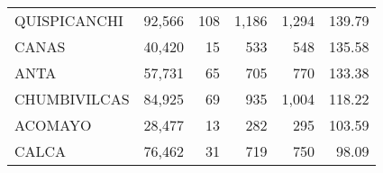 \begin{tabular}{lrrrrr}
	\cellcolor[HTML]{FFFFC7}QUISPICANCHI                                               & 92,566                                                         & 108                                                      & 1,186                                                    & 1,294                                                               & 139.79                                                                       \\
	\cellcolor[HTML]{FFFFC7}CANAS                                                      & 40,420                                                         & 15                                                       & 533                                                      & 548                                                                 & 135.58                                                                       \\
	\cellcolor[HTML]{FFFFC7}ANTA                                                       & 57,731                                                         & 65                                                       & 705                                                      & 770                                                                 & 133.38                                                                       \\
	\cellcolor[HTML]{9AFF99}CHUMBIVILCAS                                               & 84,925                                                         & 69                                                       & 935                                                      & 1,004                                                               & 118.22                                                                       \\
	\cellcolor[HTML]{9AFF99}ACOMAYO                                                    & 28,477                                                         & 13                                                       & 282                                                      & 295                                                                 & 103.59                                                                       \\
	\cellcolor[HTML]{9AFF99}CALCA                                                      & 76,462                                                         & 31                                                       & 719                                                      & 750                                                                 & 98.09                                                                        \\

\end{tabular}
